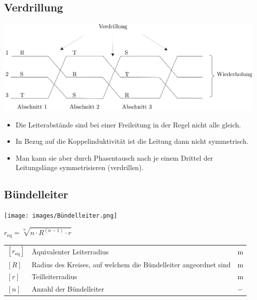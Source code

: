 \subsection{Verdrillung}

\includegraphics[width=0.98\columnwidth, align=c]{images/Verdrillung.png}

\vspace{0.15cm}

\begin{itemize}
    \item Die Leiterabstände sind bei einer Freileitung in der Regel nicht alle gleich.
    \item In Bezug auf die Koppelinduktivität ist die Leitung dann nicht symmetrisch.
    \item Man kann sie aber durch Phasentausch nach je einem Drittel der Leitungslänge symmetrisieren (verdrillen).
\end{itemize}


\subsection{Bündelleiter}

\texttt{[image: images/Bündelleiter.png]}

\vspace{0.15cm}

$
\boxed{r_\text{eq} = \sqrt[n]{n \cdot R^{(n-1)} \cdot r}}
$

\vspace{0.15cm}

\renewcommand{\arraystretch}{1.2}
\begin{tabular}{@{} l p{8cm} l @{}}
$[r_\text{eq}]$ & Äquivalenter Leiterradius \dotfill & $\mathrm{m}$ \\
$[R]$           & Radius des Kreises, auf welchem die Bündelleiter angeordnet sind \dotfill & $\mathrm{m}$ \\
$[r]$           & Teilleiterradius \dotfill & $\mathrm{m}$ \\
$[n]$           & Anzahl der Bündelleiter \dotfill & $-$ \\
\end{tabular}

























